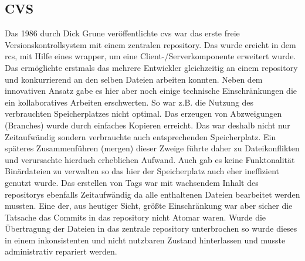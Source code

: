 \subsection{CVS}\label{sec:cvs}
Das 1986 durch Dick Grune veröffentlichte \acrfull{cvs} war das erste freie
Versionskontrollsystem mit einem zentralen \gls{repository}. Das wurde ereicht
in dem \acrshort{rcs}, mit Hilfe eines \gls{wrapper}, um eine
Client-/Serverkomponente erweitert wurde. Das ermöglichte erstmals das mehrere
Entwickler gleichzeitig an einem \gls{repository} und konkurrierend an den
selben Dateien arbeiten konnten. Neben dem innovativen Ansatz gabe es hier aber
noch einige technische Einschränkungen die ein kollaboratives Arbeiten
erschwerten. So war z.B. die Nutzung des verbrauchten Speicherplatzes nicht
optimal. Das erzeugen von Abzweigungen (Branches) wurde durch einfaches
Kopieren erreicht. Das war deshalb nicht nur Zeitaufwändig sondern verbrauchte
auch entsprechenden Speicherplatz. Ein späteres Zusammenführen (mergen) dieser
Zweige führte daher zu Dateikonflikten und verursachte hierduch erheblichen
Aufwand. Auch gab es keine Funktonalität Binärdateien zu verwalten so das hier
der Speicherplatz auch eher ineffizient genutzt wurde. Das erstellen von Tags
war mit wachsendem Inhalt des \glspl{repository} ebenfalls Zeitaufwändig da
alle enthaltenen Dateien bearbeitet werden mussten. Eine der, aus heutiger
Sicht, größte Einschränkung war aber sicher die Tatsache das Commits in das
\gls{repository} nicht Atomar waren. Wurde die Übertragung der Dateien in das
zentrale \gls{repository} unterbrochen so wurde dieses in einem inkonsistenten
und nicht nutzbaren Zustand hinterlassen und musste administrativ repariert
werden. \cite[s.~382-383]{cd}

